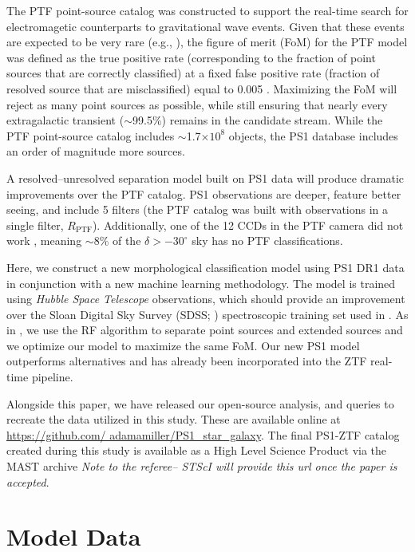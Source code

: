 \documentclass[twocolumn]{aastex62}
\begin{document}
\begin{CJK*}{UTF8}{gbsn}
The PTF point-source catalog was constructed to support the real-time search
for electromagetic counterparts to gravitational wave events. Given that
these events are expected to be very rare (e.g., \citealt{Scolnic18}), the
figure of merit (FoM) for the PTF model was defined as the true positive
rate (corresponding to the fraction of point sources that are correctly
classified) at a fixed false positive rate (fraction of resolved source that
are misclassified) equal to 0.005 \citep{Miller17}. Maximizing the FoM will
reject as many point sources as possible, while still ensuring that nearly
every extragalactic transient ($\sim$99.5\%) remains in the candidate
stream. While the PTF point-source catalog includes $\sim$1.7$\times 10^8$
objects, the PS1 database includes an order of magnitude more sources.

A resolved--unresolved separation model built on PS1 data will produce
dramatic improvements over the PTF catalog. PS1 observations are deeper,
feature better seeing, and include 5 filters (the PTF catalog was built with
observations in a single filter, $R_\mathrm{PTF}$). Additionally, one of the
12 CCDs in the PTF camera did not work \citep{Law09}, meaning $\sim$8\% of
the $\delta > -30^\circ$ sky has no PTF classifications.

Here, we construct a new morphological classification model using PS1 DR1
data in conjunction with a new machine learning methodology. The model is
trained using \textit{Hubble Space Telescope} observations, which should
provide an improvement over the Sloan Digital Sky Survey (SDSS;
\citealt{York00}) spectroscopic training set used in \citet{Miller17}. As in
\citet{Miller17}, we use the RF algorithm to separate point sources and
extended sources and we optimize our model to maximize the same FoM. Our new
PS1 model outperforms alternatives and has already been incorporated into
the ZTF real-time pipeline. 

Alongside this paper, we have released our open-source analysis, and queries
to recreate the data utilized in this study. These are available online at
\url{https://github.com/ adamamiller/PS1_star_galaxy}. The final PS1-ZTF catalog
created during this study is available as a High Level Science Product via
the MAST archive \textit{Note to the referee-- STScI will provide this url
once the paper is accepted}.

\section{Model Data}\label{sec:model_data}


\end{CJK*}
\end{document}
